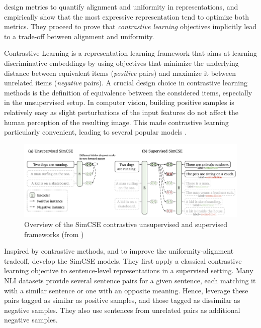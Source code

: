 \citet{pmlr-v119-wang20k} design metrics to quantify alignment and uniformity in representations, and empirically show that the most expressive representation tend to optimize both metrics. They proceed to prove that \textit{contrastive learning} objectives implicitly lead to a trade-off between alignment and uniformity.

Contrastive Learning is a representation learning framework that aims at learning discriminative embeddings by using objectives that minimize the underlying distance between equivalent items (\textit{positive} pairs) and maximize it between unrelated items (\textit{negative} pairs). A crucial design choice in contrastive learning methods is the definition of equivalence between the considered items, especially in the unsupervised setup. In computer vision, building positive samples is relatively easy as slight perturbations of the input features do not affect the human perception of the resulting image. This made contrastive learning particularly convenient, leading to several popular models \citep{simclr, He_2020_CVPR}.

\begin{figure}[ht]
  \centering
  \includegraphics[width=0.9\linewidth]{sources/related_works/imgs/simcse.png}
  \caption{Overview of the SimCSE contrastive unsupervised and supervised frameworks (from \citet{gao-etal-2021-simcse})}
  \label{fig:simcse}
\end{figure}

Inspired by contrastive methods, and to improve the uniformity-alignment tradeoff, \citet{gao-etal-2021-simcse} develop the SimCSE models. They first apply a classical contrastive learning objective to sentence-level representations in a supervised setting. Many NLI datasets provide several sentence pairs for a given sentence, each matching it with a similar sentence or one with an opposite meaning. Hence, \citet{gao-etal-2021-simcse} leverage these pairs tagged as similar as positive samples, and those tagged as dissimilar as negative samples. They also use sentences from unrelated pairs as additional negative samples. 

